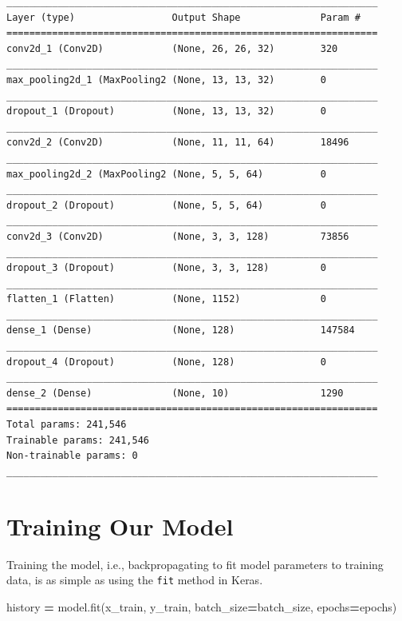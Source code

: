 \documentclass[]{book}
\newenvironment{Shaded}{\begin{snugshade}}{\end{snugshade}}
\newcommand{\OperatorTok}[1]{\textcolor[rgb]{0.81,0.36,0.00}{\textbf{#1}}}
\newcommand{\NormalTok}[1]{#1}
\theoremstyle{definition}
\theoremstyle{definition}
\theoremstyle{definition}
\theoremstyle{remark}
\begin{document}
\begin{verbatim}
_________________________________________________________________
Layer (type)                 Output Shape              Param #   
=================================================================
conv2d_1 (Conv2D)            (None, 26, 26, 32)        320       
_________________________________________________________________
max_pooling2d_1 (MaxPooling2 (None, 13, 13, 32)        0         
_________________________________________________________________
dropout_1 (Dropout)          (None, 13, 13, 32)        0         
_________________________________________________________________
conv2d_2 (Conv2D)            (None, 11, 11, 64)        18496     
_________________________________________________________________
max_pooling2d_2 (MaxPooling2 (None, 5, 5, 64)          0         
_________________________________________________________________
dropout_2 (Dropout)          (None, 5, 5, 64)          0         
_________________________________________________________________
conv2d_3 (Conv2D)            (None, 3, 3, 128)         73856     
_________________________________________________________________
dropout_3 (Dropout)          (None, 3, 3, 128)         0         
_________________________________________________________________
flatten_1 (Flatten)          (None, 1152)              0         
_________________________________________________________________
dense_1 (Dense)              (None, 128)               147584    
_________________________________________________________________
dropout_4 (Dropout)          (None, 128)               0         
_________________________________________________________________
dense_2 (Dense)              (None, 10)                1290      
=================================================================
Total params: 241,546
Trainable params: 241,546
Non-trainable params: 0
_________________________________________________________________
\end{verbatim}

\section{Training Our Model}\label{training-our-model}

Training the model, i.e., backpropagating to fit model parameters to
training data, is as simple as using the \texttt{fit} method in Keras.

\begin{Shaded}
\begin{Highlighting}[]
\NormalTok{history }\OperatorTok{=}\NormalTok{ model.fit(x_train, y_train,}
\NormalTok{          batch_size}\OperatorTok{=}\NormalTok{batch_size,}
\NormalTok{          epochs}\OperatorTok{=}\NormalTok{epochs)}
\end{Highlighting}
\end{Shaded}
\end{document}

